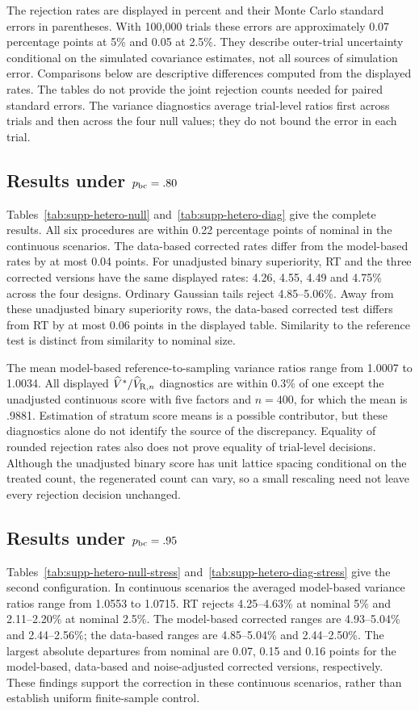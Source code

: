 \documentclass[12pt,a4paper]{article}
\theoremstyle{definition}
\theoremstyle{remark}\newtheorem{remark}{Remark}
\numberwithin{equation}{section}
\begin{document}
The rejection rates are displayed in percent and their Monte Carlo standard errors in parentheses. With 100,000 trials these errors are approximately 0.07 percentage points at 5\% and 0.05 at 2.5\%. They describe outer-trial uncertainty conditional on the simulated covariance estimates, not all sources of simulation error. Comparisons below are descriptive differences computed from the displayed rates. The tables do not provide the joint rejection counts needed for paired standard errors. The variance diagnostics average trial-level ratios first across trials and then across the four null values; they do not bound the error in each trial.

\subsection{Results under \texorpdfstring{$p_{\rm bc}=.80$}{p=0.80}}
Tables~\ref{tab:supp-hetero-null} and~\ref{tab:supp-hetero-diag} give the complete results. All six procedures are within 0.22 percentage points of nominal in the continuous scenarios. The data-based corrected rates differ from the model-based rates by at most 0.04 points. For unadjusted binary superiority, RT and the three corrected versions have the same displayed rates: 4.26, 4.55, 4.49 and 4.75\% across the four designs. Ordinary Gaussian tails reject 4.85--5.06\%. Away from these unadjusted binary superiority rows, the data-based corrected test differs from RT by at most 0.06 points in the displayed table. Similarity to the reference test is distinct from similarity to nominal size.

The mean model-based reference-to-sampling variance ratios range from 1.0007 to 1.0034. All displayed $\widehat V^*/\widehat V_{{\rm R},n}$ diagnostics are within 0.3\% of one except the unadjusted continuous score with five factors and $n=400$, for which the mean is .9881. Estimation of stratum score means is a possible contributor, but these diagnostics alone do not identify the source of the discrepancy. Equality of rounded rejection rates also does not prove equality of trial-level decisions. Although the unadjusted binary score has unit lattice spacing conditional on the treated count, the regenerated count can vary, so a small rescaling need not leave every rejection decision unchanged.

\subsection{Results under \texorpdfstring{$p_{\rm bc}=.95$}{p=0.95}}
Tables~\ref{tab:supp-hetero-null-stress} and~\ref{tab:supp-hetero-diag-stress} give the second configuration. In continuous scenarios the averaged model-based variance ratios range from 1.0553 to 1.0715. RT rejects 4.25--4.63\% at nominal 5\% and 2.11--2.20\% at nominal 2.5\%. The model-based corrected ranges are 4.93--5.04\% and 2.44--2.56\%; the data-based ranges are 4.85--5.04\% and 2.44--2.50\%. The largest absolute departures from nominal are 0.07, 0.15 and 0.16 points for the model-based, data-based and noise-adjusted corrected versions, respectively. These findings support the correction in these continuous scenarios, rather than establish uniform finite-sample control.
\end{document}
